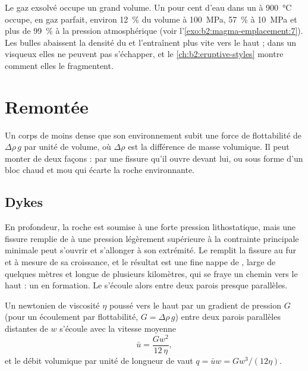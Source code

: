 Le gaz exsolvé occupe un grand volume. Un pour cent d'eau dans un  à
\qty{900}{\celsius} occupe, en gaz parfait, environ \qty{12}{\percent} du
volume à \qty{100}{MPa}, \qty{57}{\percent} à \qty{10}{MPa} et plus de
\qty{99}{\percent} à la pression atmosphérique (voir l'\cref{exo:b2:magma-emplacement:7}). Les bulles abaissent
la densité du  et l'entraînent plus vite vers le haut ; dans un  visqueux
elles ne peuvent pas s'échapper, et le \cref{ch:b2:eruptive-styles} montre comment elles le fragmentent.

\section{Remontée}

Un corps de  moins dense que son environnement subit une force de flottabilité de
$\Delta\rho\,g$ par unité de volume, où $\Delta\rho$ est la différence de masse volumique. Il
peut monter de deux façons : par une fissure qu'il ouvre devant lui, ou sous forme d'un
bloc chaud et mou qui écarte la roche environnante.

\subsection{Dykes}

En profondeur, la roche est soumise à une forte pression lithostatique, mais une fissure remplie
de  à une pression légèrement supérieure à la contrainte principale minimale peut
s'ouvrir et s'allonger à son extrémité. Le  remplit la fissure au fur et à mesure
de sa croissance, et le résultat est une fine nappe de , large de quelques mètres et longue de plusieurs kilomètres, qui
se fraye un chemin vers le haut : un  en formation. Le  s'écoule alors entre deux
parois presque parallèles.

\begin{proposition}\label{prop:b2:magma-emplacement:poiseuille}
Un  newtonien de viscosité $\eta$ poussé vers le haut par un gradient de pression $G$
(pour un écoulement par flottabilité, $G = \Delta\rho\,g$) entre deux parois parallèles distantes de $w$
s'écoule avec la vitesse moyenne
\[
\bar u = \frac{G w^2}{12\,\eta},
\]
et le débit volumique par unité de longueur de  vaut $q = \bar u w = G w^3/(12\eta)$.
\end{proposition}

